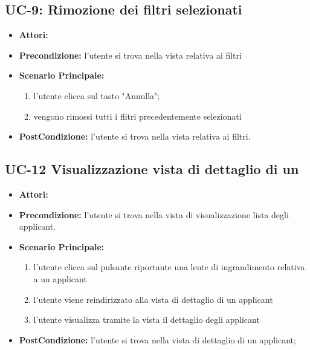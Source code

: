 \subsection{UC-9: Rimozione dei filtri selezionati}
\begin{itemize}
\item \textbf{Attori:}\loggedusr
\item \textbf{Precondizione:} l'utente si trova nella vista relativa ai filtri
\item \textbf{Scenario Principale:}
\begin{enumerate}
	\item l'utente clicca sul tasto "Annulla";
	\item vengono rimossi tutti i flitri precedentemente selezionati
\end{enumerate}
\item \textbf{PostCondizione:} l'utente si trova nella vista relativa ai filtri.
\end{itemize}



\subsection{UC-12 Visualizzazione vista di dettaglio di un\applicant}
\begin{itemize}
\item \textbf{Attori:}\loggedusr
\item \textbf{Precondizione:} l'utente si trova nella vista di visualizzazione lista degli applicant. 
\item \textbf{Scenario Principale:}
\begin{enumerate}
	\item l'utente clicca sul pulsante riportante una lente di ingrandimento relativa a un applicant
	\item l'utente viene reindirizzato alla vista di dettaglio di un applicant
	\item l'utente visualizza tramite la vista il dettaglio degli applicant
\end{enumerate}
\item \textbf{PostCondizione:} l'utente si trova nella vista di dettaglio di un applicant;
\end{itemize}






